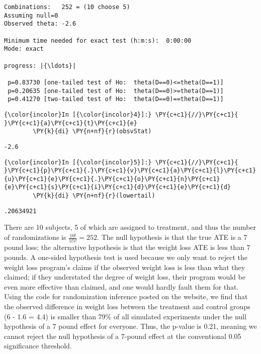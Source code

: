 \documentclass[11pt,notitlepage]{article}\usepackage[]{graphicx}\usepackage[]{color}
\makeatletter
\newenvironment{kframe}{%
 \def\at@end@of@kframe{}%
 \ifinner\ifhmode%
  \def\at@end@of@kframe{\end{minipage}}%
  \begin{minipage}{\columnwidth}%
 \fi\fi%
 \def\FrameCommand##1{\hskip\@totalleftmargin \hskip-\fboxsep
 \colorbox{shadecolor}{##1}\hskip-\fboxsep
     \hskip-\linewidth \hskip-\@totalleftmargin \hskip\columnwidth}%
 \MakeFramed {\advance\hsize-\width
   \@totalleftmargin\z@ \linewidth\hsize
   \@setminipage}}%
 {\par\unskip\endMakeFramed%
 \at@end@of@kframe}
\newenvironment{knitrout}{}{} %
\makeatother
\begin{document}
\begin{knitrout}
\begin{kframe}
\begin{Verbatim}[commandchars=\\\{\}]
Combinations:   252 = (10 choose 5)
Assuming null=0
Observed theta: -2.6

Minimum time needed for exact test (h:m:s):  0:00:00
Mode: exact

progress: |{\ldots}|

 p=0.83730 [one-tailed test of Ho:  theta(D==0)<=theta(D==1)]
 p=0.20635 [one-tailed test of Ho:  theta(D==0)>=theta(D==1)]
 p=0.41270 [two-tailed test of Ho:  theta(D==0)==theta(D==1)]

    \end{Verbatim}

    \begin{Verbatim}[commandchars=\\\{\}]
{\color{incolor}In [{\color{incolor}4}]:} \PY{c+c1}{//}\PY{c+c1}{ }\PY{c+c1}{a}\PY{c+c1}{t}\PY{c+c1}{e}
        \PY{k}{di} \PY{n+nf}{r}(obsvStat)
\end{Verbatim}

    \begin{Verbatim}[commandchars=\\\{\}]
-2.6

    \end{Verbatim}

    \begin{Verbatim}[commandchars=\\\{\}]
{\color{incolor}In [{\color{incolor}5}]:} \PY{c+c1}{//}\PY{c+c1}{ }\PY{c+c1}{p}\PY{c+c1}{.}\PY{c+c1}{v}\PY{c+c1}{a}\PY{c+c1}{l}\PY{c+c1}{u}\PY{c+c1}{e}\PY{c+c1}{.}\PY{c+c1}{o}\PY{c+c1}{n}\PY{c+c1}{e}\PY{c+c1}{s}\PY{c+c1}{i}\PY{c+c1}{d}\PY{c+c1}{e}\PY{c+c1}{d}
        \PY{k}{di} \PY{n+nf}{r}(lowertail)
\end{Verbatim}

    \begin{Verbatim}[commandchars=\\\{\}]
.20634921

    \end{Verbatim}

\end{kframe}
\end{knitrout}

There are 10 subjects, 5 of which are assigned to treatment, and thus the number of randomizations is $\frac{10!}{5!5!}=252$.  The null hypothesis is that the true ATE is a 7 pound loss; the alternative hypothesis is that the weight loss ATE is less than 7 pounds.  A one-sided hypothesis test is used because we only want to reject the weight loss program's claims if the observed weight loss is less than what they claimed; if they understated the degree of weight loss, their program would be even more effective than claimed, and one would hardly fault them for that.  Using the code for randomization inference posted on the website, we find that the observed difference in weight loss between the treatment and control groups (6 - 1.6 = 4.4) is smaller than 79\% of all simulated experiments under the null hypothesis of a 7 pound effect for everyone.  Thus, the p-value is 0.21, meaning we cannot reject the null hypothesis of a 7-pound effect at the conventional 0.05 significance threshold.
\end{document}
